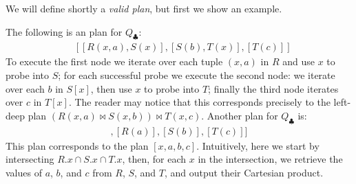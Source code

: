 
We will define shortly a {\em valid plan}, but first we show an example.



\begin{example}\label{ex:fj-plan}
  The following is an \FJ plan for $Q_\clubsuit$:
\begin{align}
&  [[R(x, a), S(x)], [S(b), T(x)], [T(c)]]\label{eq:bj-plan}
\end{align}
%
To execute the first node we iterate over each tuple $(x, a)$ in $R$
and use $x$ to probe into $S$; for each successful probe we execute
the second node: we iterate over each $b$ in $S[x]$, then use
$x$ to probe into $T$; finally the third node iterates over $c$ in
$T[x]$.  The reader may notice that this corresponds precisely to the
left-deep plan $(R(x,a) \Join S(x,b))\Join T(x,c)$.
%
Another \FJ plan for $Q_\clubsuit$ is: 
%
\begin{align}
  [[R(x), S(x), T(x)], [R(a)], [S(b)], [T(c)]]\label{eq:gj-plan}
\end{align}
%
This plan corresponds to the \GJ plan $[x,a,b,c]$.  Intuitively, here
we start by intersecting $R.x \cap S.x \cap T.x$, then, for each $x$
in the intersection, we retrieve the values of $a$, $b$, and $c$ from
$R$, $S$, and $T$, and output their Cartesian product.
\end{example}


